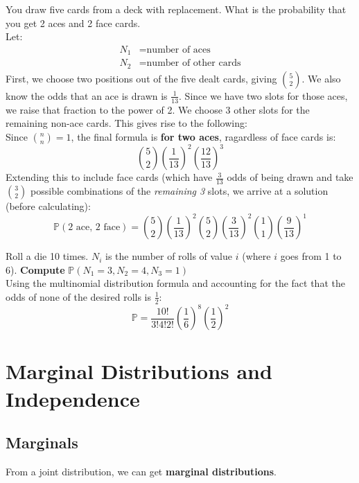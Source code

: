 \documentclass[titlepage, 12pt, leqno]{article}
\begin{document}
\begin{ex}
    You draw five cards from a deck with replacement. What is the probability 
    that you get 2 aces and 2 face cards. \\[.1in]
    Let:
   \begin{align*}
       N_1 &= \text{number of aces} \\
       N_2 &= \text{number of other cards}
   \end{align*}
   First, we choose two positions out of the five dealt cards, giving 
   $\binom{5}{2}$. We also know the odds that an ace is drawn is $\frac{1}{13}$.
   Since we have two slots for those aces, we raise that fraction to the power of
   2. We choose 3 other slots for the remaining non-ace cards. This gives rise to
   the following:
   \[
   \]
   Since $\binom{n}{n} = 1$, the final formula is \textbf{for two aces}, 
   ragardless of face cards is:
   \[
   \binom{5}{2}\left(\frac{1}{13} \right)^2 \left(\frac{12}{13}\right)^3
   \]
   Extending this to include face cards (which have $\frac{3}{13}$ odds of being
   drawn and take $\binom{3}{2}$ possible combinations of the \textit{remaining
   3} slots, we arrive at a solution (before calculating):
   \[
       \boxed{\mathbb{P}( \text{2 ace, 2 face}) = \binom{5}{2}\left(\frac{1}{13}
           \right)^2  \binom{5}{2}\left(\frac{3}{13} \right)^2 \binom{1}{1}
           \left(\frac{9}{13} \right)^1} 
   \]
\end{ex}

\begin{ex}
    Roll a die 10 times. $N_i$ is the number of rolls of value $i$ (where $i$ 
    goes from 1 to 6). \textbf{Compute} $\mathbb{P}(N_1=3,N_2=4,N_3=1)$ \\[.1in]
    Using the multinomial distribution formula and accounting for the fact that
    the odds of none of the desired rolls is $\frac{1}{2}$:
    \[
    \boxed{\mathbb{P} = \frac{10!}{3!4!2!} \left(\frac{1}{6}\right)^8
    \left(\frac{1}{2} \right)^2}
    \]
\end{ex}

\pagebreak
\section{Marginal Distributions and Independence}
\subsection{Marginals}
From a joint distribution, we can get \textbf{marginal distributions}.
\end{document}
